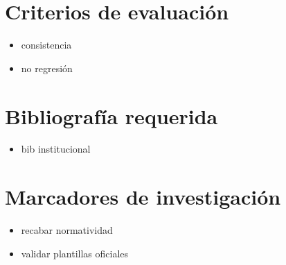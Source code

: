 \documentclass[12pt]{article}
\begin{document}
\section*{Criterios de evaluación}
\begin{itemize}[leftmargin=*]
  \item consistencia
  \item no regresión
\end{itemize}

\section*{Bibliografía requerida}
\begin{itemize}[leftmargin=*]
  \item bib institucional
\end{itemize}

\section*{Marcadores de investigación}
\begin{itemize}[leftmargin=*]
  \item recabar normatividad
  \item validar plantillas oficiales
\end{itemize}
\end{document}

